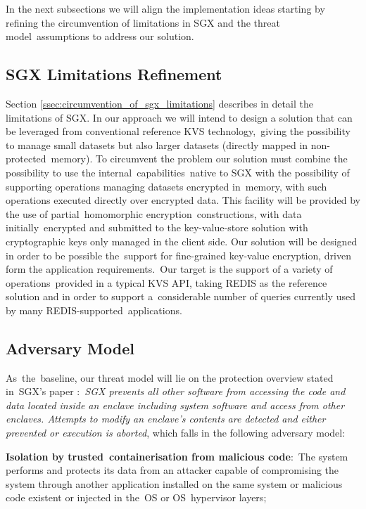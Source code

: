 In the next subsections we will align the implementation ideas starting by refining the circumvention of limitations in SGX and the threat model assumptions to address our solution.

\subsection{\gls{SGX} Limitations Refinement}
\label{ssec:sgx_limitations_refinement}

Section \ref{ssec:circumvention_of_sgx_limitations} describes in detail the limitations of \gls{SGX}. In our approach we will intend to design a solution that can be leveraged from conventional reference KVS technology, giving the possibility to manage small datasets but also larger datasets (directly mapped in non-protected memory). To circumvent the problem our solution must combine the possibility to use the internal capabilities native to SGX with the possibility of supporting operations managing datasets encrypted in memory, with such operations executed directly over encrypted data. This facility will be provided by the use of partial homomorphic encryption constructions, with data initially encrypted and submitted to the key-value-store solution with cryptographic keys only managed in the client side. Our solution will be designed in order to be possible the support for fine-grained key-value encryption, driven form the application requirements. Our target is the support of a variety of operations provided in a typical KVS API, taking REDIS as the reference solution and in order to support a considerable number of queries currently used by many REDIS-supported applications.

\subsection{Adversary Model}
\label{ssec:adversary_model}

As the baseline, our threat model will lie on the protection overview stated in SGX’s paper \cite{sgx:7}: \textit{SGX prevents all other software from accessing the code and data located inside an enclave including system software and access from other enclaves. Attempts to modify an enclave’s contents are detected and either prevented or execution is aborted}, which falls in the following adversary model:

\textbf{Isolation by trusted containerisation from malicious code}: The system performs and protects its data from an attacker capable of compromising the system through another application installed on the same system or malicious code existent or injected in the OS or OS hypervisor layers;

